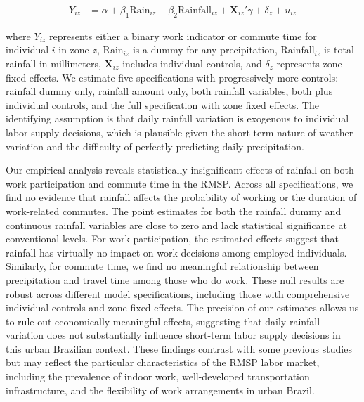 \begin{align*}
Y_{iz} &= \alpha + \beta_1 \text{Rain}_{iz} + \beta_2 \text{Rainfall}_{iz} + \mathbf{X}_{iz}'\gamma + \delta_z + u_{iz}
\end{align*}

where $Y_{iz}$ represents either a binary work indicator or commute time for individual $i$ in zone $z$, $\text{Rain}_{iz}$ is a dummy for any precipitation, $\text{Rainfall}_{iz}$ is total rainfall in millimeters, $\mathbf{X}_{iz}$ includes individual controls, and $\delta_z$ represents zone fixed effects. We estimate five specifications with progressively more controls: rainfall dummy only, rainfall amount only, both rainfall variables, both plus individual controls, and the full specification with zone fixed effects. The identifying assumption is that daily rainfall variation is exogenous to individual labor supply decisions, which is plausible given the short-term nature of weather variation and the difficulty of perfectly predicting daily precipitation.

Our empirical analysis reveals statistically insignificant effects of rainfall on both work participation and commute time in the RMSP. Across all specifications, we find no evidence that rainfall affects the probability of working or the duration of work-related commutes. The point estimates for both the rainfall dummy and continuous rainfall variables are close to zero and lack statistical significance at conventional levels. For work participation, the estimated effects suggest that rainfall has virtually no impact on work decisions among employed individuals. Similarly, for commute time, we find no meaningful relationship between precipitation and travel time among those who do work. These null results are robust across different model specifications, including those with comprehensive individual controls and zone fixed effects. The precision of our estimates allows us to rule out economically meaningful effects, suggesting that daily rainfall variation does not substantially influence short-term labor supply decisions in this urban Brazilian context. These findings contrast with some previous studies but may reflect the particular characteristics of the RMSP labor market, including the prevalence of indoor work, well-developed transportation infrastructure, and the flexibility of work arrangements in urban Brazil.

